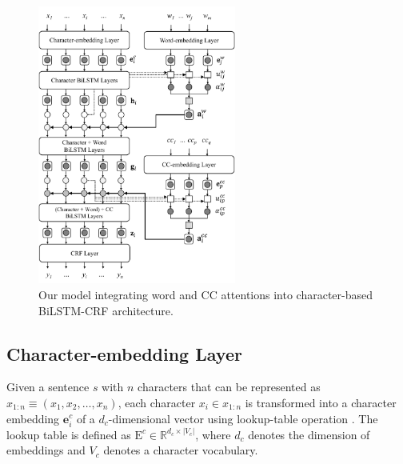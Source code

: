 \begin{figure}[ht]
    \centering
    \includegraphics[width=0.58\textwidth]{figures/fig-main-model.pdf}
    \caption{Our model integrating word and CC attentions into character-based BiLSTM-CRF architecture.}
    \label{fig:main-model}
\end{figure}
%

\subsection{Character-embedding Layer}
Given a sentence $s$ with $n$ characters that can be represented as $x_{1:n} \equiv (x_1, x_2, \dots, x_n)$, each character $x_{i} \in x_{1:n}$ is transformed into a character embedding $\textbf{e}_{i}^{c}$ of a $d_{c}$-dimensional vector using lookup-table operation \cite{Bengio2003,Collobert2011}.
%
The lookup table is defined as $\text{E}^{c} \in \mathbb{R}^{d_{c} \times |V_c|}$, where $d_{c}$ denotes the dimension of embeddings and $V_c$ denotes a character vocabulary.
%

